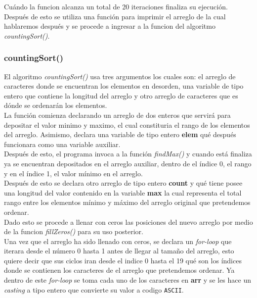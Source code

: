 \documentclass{article}
\begin{document}
				Cuándo la funcion alcanza un total de 20 iteraciones finaliza su ejecución.\\
				
				Después de esto se utiliza una función para imprimir el arreglo de la cual hablaremos después y se procede a ingresar a la funcion del algoritmo \emph{countingSort()}.
			
			\subsubsection{countingSort()}
			
				El algoritmo \emph{countingSort()} usa tres argumentos los cuales son: el arreglo de caracteres donde se encuentran los elementos en desorden, una variable de tipo entero que contiene la longitud del arreglo y otro arreglo de caracteres que es dónde se ordenarán los elementos.\\
				
				La función comienza declarando un arreglo de dos enteros que servirá para depositar el valor minimo y maximo, el cual constituria el rango de los elementos del arreglo. Asimismo, declara una variable de tipo entero \textbf{elem} qué después funcionara como una variable auxiliar.\\ 
				
				Después de esto, el programa invoca a la función \emph{findMax()} y cuando está finaliza ya se encuentran depositados en el arreglo auxiliar, dentro de el índice 0, el rango y en el índice 1, el valor mínimo en el  arreglo.\\
				
				Después de esto se declara otro arreglo de tipo entero \textbf{count} y qué tiene posee una longitud del valor contenido en la variable \textbf{max} la cual representa el total rango entre los elementos mínimo y máximo del arreglo original que pretendemos ordenar.\\
				
				Dado esto se procede a llenar con ceros las posiciones del nuevo arreglo por medio de la funcion \emph{fillZeros()} para su uso posterior.\\
				
				Una vez que el arreglo ha sido llenado con ceros, se declara un \emph{for-loop} que iterara desde el número 0 hasta 1 antes de llegar al tamaño del arreglo, esto quiere decir que sus ciclos iran desde el indice 0 hasta el 19 qué son los índices donde se contienen los caracteres de el arreglo que pretendemos ordenar. Ya dentro de este \emph{for-loop} se toma cada uno de los caracteres en \textbf{arr} y se les hace un \emph{casting} a tipo entero que convierte su valor a codigo \verb|ASCII|.\\
				
\end{document}
